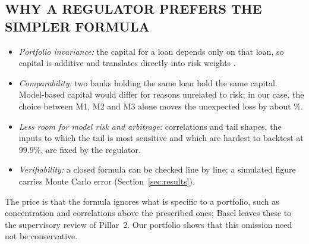 \subsection{WHY A REGULATOR PREFERS THE SIMPLER FORMULA}
\begin{itemize}
\item \emph{Portfolio invariance:} the capital for a loan depends only on that loan, so capital is additive and translates directly into risk weights \citep{Gordy03}.
\item \emph{Comparability:} two banks holding the same loan hold the same capital. Model-based capital would differ for reasons unrelated to risk; in our case, the choice between M1, M2 and M3 alone moves the unexpected loss by about \%.
\item \emph{Less room for model risk and arbitrage:} correlations and tail shapes, the inputs to which the tail is most sensitive and which are hardest to backtest at $99.9\%$, are fixed by the regulator.
\item \emph{Verifiability:} a closed formula can be checked line by line; a simulated figure carries Monte Carlo error (Section~\ref{sec:results}).
\end{itemize}
The price is that the formula ignores what is specific to a portfolio, such as concentration and correlations above the prescribed ones; Basel leaves these to the supervisory review of Pillar~2. Our portfolio shows that this omission need not be conservative.
